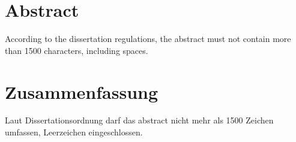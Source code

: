 \section*{Abstract}

According to the dissertation regulations, the abstract must not contain more than 1500 characters, including spaces.

\cleardoublepage

\section*{Zusammenfassung}

Laut Dissertationsordnung darf das abstract nicht mehr als 1500 Zeichen umfassen, Leerzeichen eingeschlossen.

\cleardoublepage